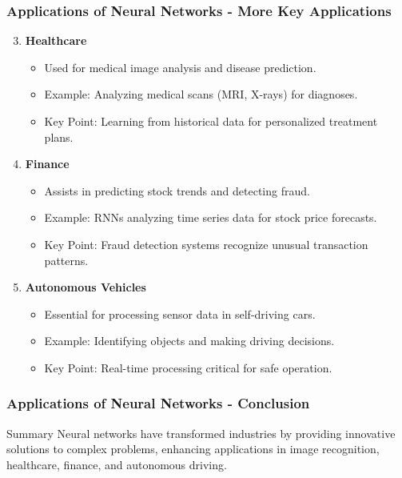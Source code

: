\documentclass[aspectratio=169]{beamer}
\begin{document}
\begin{frame}[fragile]
    \frametitle{Applications of Neural Networks - More Key Applications}
    \begin{enumerate}
        \setcounter{enumi}{2}
        \item \textbf{Healthcare}
        \begin{itemize}
            \item Used for medical image analysis and disease prediction.
            \item Example: Analyzing medical scans (MRI, X-rays) for diagnoses.
            \item Key Point: Learning from historical data for personalized treatment plans.
        \end{itemize}

        \item \textbf{Finance}
        \begin{itemize}
            \item Assists in predicting stock trends and detecting fraud.
            \item Example: RNNs analyzing time series data for stock price forecasts.
            \item Key Point: Fraud detection systems recognize unusual transaction patterns.
        \end{itemize}
        
        \item \textbf{Autonomous Vehicles}
        \begin{itemize}
            \item Essential for processing sensor data in self-driving cars.
            \item Example: Identifying objects and making driving decisions.
            \item Key Point: Real-time processing critical for safe operation.
        \end{itemize}
    \end{enumerate}
\end{frame}

\begin{frame}[fragile]
    \frametitle{Applications of Neural Networks - Conclusion}
    \begin{block}{Summary}
        Neural networks have transformed industries by providing innovative solutions to complex problems, enhancing applications in image recognition, healthcare, finance, and autonomous driving.
    \end{block}
\end{frame}
\end{document}
